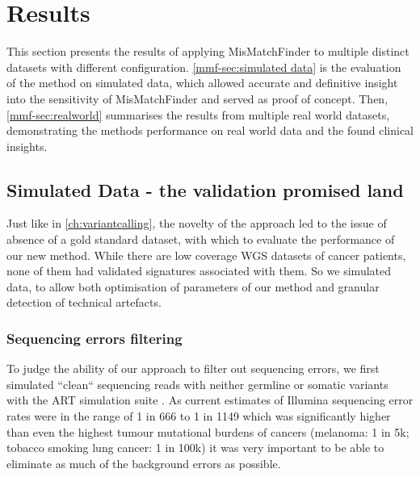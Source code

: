 
\section{Results}
\label{mmf-sec:results}
This section presents the results of applying MisMatchFinder to multiple distinct datasets with different configuration. \autoref{mmf-sec:simulated data} is the evaluation of the method on simulated data, which allowed accurate and definitive insight into the sensitivity of MisMatchFinder and served as proof of concept. Then, \autoref{mmf-sec:realworld} summarises the results from multiple real world datasets, demonstrating the methods performance on real world data and the found clinical insights.

\subsection{Simulated Data - the validation promised land}
\label{mmf-sec:simulated data}
Just like in \autoref{ch:variantcalling}, the novelty of the approach led to the issue of absence of a gold standard dataset, with which to evaluate the performance of our new method. While there are low coverage WGS datasets of cancer patients, none of them had validated signatures associated with them. So we simulated data, to allow both optimisation of parameters of our method and granular detection of technical artefacts. 

\subsubsection{Sequencing errors filtering}
\label{mmf-sec:cleanSim}
To judge the ability of our approach to filter out sequencing errors, we first simulated ``clean`` sequencing reads with neither germline or somatic variants with the ART simulation suite \cite{Huang2011}. As current estimates of Illumina sequencing error rates were in the range of 1 in 666 to 1 in 1149 \cite{Stoler2021} which was significantly higher than even the highest tumour mutational burdens of  cancers (melanoma: 1 in 5k; tobacco smoking lung cancer: 1 in 100k) it was very important to be able to eliminate as much of the background errors as possible.

